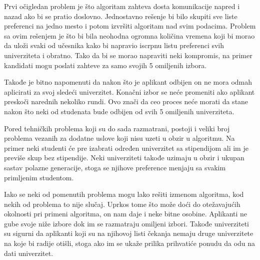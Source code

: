 \documentclass[a4paper]{article}
\begin{document}
Prvi očigledan problem je što algoritam zahteva dosta komunikacije napred i nazad ako bi se pratio doslovno. Jednostavno rešenje bi bilo skupiti sve liste preferenci na jedno mesto i potom izvršiti algoritam nad svim podacima. Problem sa ovim rešenjem je što bi bila neohodna ogromna količina vremena koji bi morao da uloži svaki od učesnika kako bi napravio iscrpnu listu preferenci svih univerziteta i obratno. Tako da bi se morao napraviti neki kompromis, na primer kandidati mogu poslati zahteve za samo svojih 5 omiljenih izbora.

Takođe je bitno napomenuti da nakon što je aplikant odbijen on ne mora odmah aplicirati za svoj sledeći univerzitet. Konačni izbor se neće promeniti ako aplikant preskoči narednih nekoliko rundi. Ovo znači da ceo proces neće morati da stane nakon što neki od studenata bude odbijen od svih 5 omiljenih univerziteta.

Pored tehničkih problema koji su do sada razmatrani, postoji i veliki broj problema vezanih za dodatne uslove koji nisu uzeti u obzir u algoritmu. Na primer neki studenti će pre izabrati određen univerzitet sa stipendijom ali im je previše skup bez stipendije. Neki univerziteti takođe uzimaju u obzir i ukupan sastav polazne generacije, stoga se njihove preference menjaju sa svakim primljenim studentom.

Iako se neki od pomenutih problema mogu lako rešiti izmenom algoritma, kod nekih od problema to nije slučaj. Uprkos tome što može doći do otežavajućih okolnosti pri primeni algoritma, on nam daje i neke bitne osobine. Aplikanti ne gube svoje niže izbore dok im se razmatraju omiljeni izbori. Takođe univerziteti su sigurni da aplikanti koji su na njihovoj listi čekanja nemaju druge univerzitete na koje bi radije otišli, stoga ako im se ukaže prilika prihvatiće ponudu da odu na dati univerzitet.

\appendix
 

\end{document}
